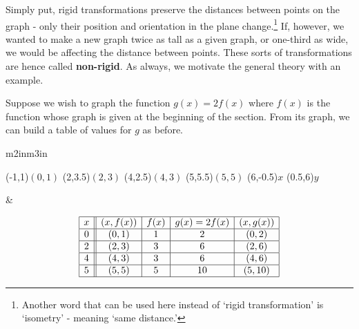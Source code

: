 \documentclass{ximera}
\begin{document}
\smallskip

Simply put, rigid transformations preserve the distances between points on the graph -  only their position and orientation in the plane change.\footnote{Another word that can be used here instead of `rigid transformation' is `isometry' - meaning `same distance.'}  If, however, we wanted to make a new graph twice as tall as a given graph, or one-third as wide, we would be affecting the distance between points. These sorts of transformations are hence called \textbf{non-rigid}.  As always, we motivate the general theory with an example.

\smallskip

Suppose we wish to graph the function $g(x) =2 f(x)$ where $f(x)$ is the function whose graph is given at the beginning of the section. From its graph, we can build a table of values for $g$ as before.

\begin{center}

\begin{tabular}{m{2in}m{3in}}

\begin{mfpic}[15]{-1}{6}{-1}{6}
\tlabel[cc](-1,1){\scriptsize $(0,1)$}
\tlabel[cc](2,3.5){\scriptsize $(2,3)$}
\tlabel[cc](4,2.5){\scriptsize $(4,3)$}
\tlabel[cc](5,5.5){\scriptsize $(5,5)$}
\tlabel[cc](6,-0.5){\scriptsize $x$}
\tlabel[cc](0.5,6){\scriptsize $y$}
\axes
{}
\tlpointsep{4pt}
\penwd{1.25pt}
\end{mfpic}
 
&

\[ \begin{array}{|c||c|c|c|c|}  

\hline

 x & (x,f(x)) & f(x) & g(x)=2f(x) & (x, g(x)) \\ \hline
0  & (0,1)& 1 & 2 &(0, 2) \\  \hline
2 & (2,3) & 3 &  6 &(2,6) \\  \hline
4 & (4,3) & 3 &  6 &(4, 6) \\  \hline
5 & (5,5) & 5 &  10 &( 5 ,10) \\  \hline

\end{array} \] 

\end{tabular}

\end{center}
\end{document}

